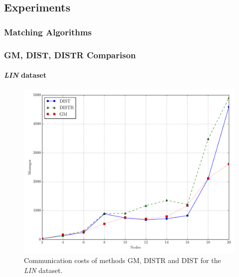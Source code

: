 \documentclass[hyperref={pdfpagelabels=false}]{beamer}
\begin{document}
\subsection{Experiments}

\subsubsection*{ Matching Algorithms}
\begin{frame} \frametitle{GM, DIST, DISTR Comparison} \framesubtitle{\emph{LIN} dataset}
\begin{figure}
\vspace{-0.5cm}
\centering
\includegraphics[scale=0.3]{../img/matching_msg_linear.pdf}
  \caption{Communication costs of methods GM, DISTR and DIST for the \emph{LIN} dataset.}
\end{figure}
\end{frame}
\end{document}
